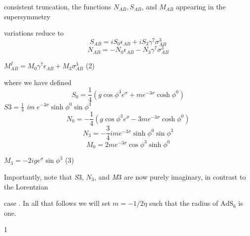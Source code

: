 \documentclass[a4paper,12pt]{article}
\begin{document}
consistent truncation, the functions $N_{AB}, S_{AB}$, and $M_{AB}$ appearing in the supersymmetry

variations reduce to
$$
S_{AB}=iS_{0}\epsilon_{AB}+iS_{3}\gamma^{7}\sigma_{AB}^{3}
$$
$$
N_{AB}=-N_{0}\epsilon_{AB}-N_{3}\gamma^{7}\sigma_{AB}^{3}
$$
\begin{center}
$M_{AB}^{I}=M_{0}\gamma^{7}\epsilon_{AB}+M_{3}\sigma_{AB}^{3}$   (2)
\end{center}
where we have defined
$$
S_{0}=\frac{1}{4}(g\cos\phi^{3}e^{\sigma}+me^{-3\sigma}\cosh\phi^{0})
$$
$S3=\displaystyle \frac{1}{4}$ {\it im} $e^{-3\sigma}\sinh\phi^{0}\sin\phi^{3}$
$$
N_{0}=-\frac{1}{4}(g\cos\phi^{3}e^{\sigma}-3me^{-3\sigma}\cosh\phi^{0})
$$
$$
N_{3}=-\frac{3}{4}ime^{-3\sigma}\sinh\phi^{0}\sin\phi^{3}
$$
$$
M_{0}=2me^{-3\sigma}\cos\phi^{3}\sinh\phi^{0}
$$
\begin{center}
$M_{3}=-2ige^{\sigma}\sin\phi^{3}$   (3)
\end{center}
Importantly, note that {\it S}3, $N_{3}$, and {\it M}3 are now purely imaginary, in contrast to the Lorentzian

case . In all that follows we will set $ m=-1/2\eta$ such that the radius of $\mathrm{A}\mathrm{d}\mathrm{S}_{6}$ is one.

1
\end{document}
